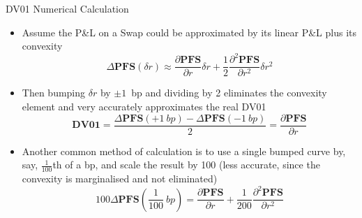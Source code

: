 \documentclass{beamer}
\begin{document}

\begin{frame}{DV01 Numerical Calculation}
\begin{itemize}
	\item<1-> Assume the P\&L on a Swap could be approximated by its linear P\&L plus its convexity
	\begin{equation*}
	\Delta \textbf{PFS}(\delta r)\approx \frac{\partial \textbf{PFS} }{\partial r}\delta r + \frac{1}{2}\frac{\partial^2 \textbf{PFS}}{\partial r^2}\delta r^2
	\end{equation*}
	\item<2-> Then bumping $\delta r$ by $\pm 1$~bp and dividing by 2 eliminates the convexity element and very accurately approximates the real DV01
	\begin{equation*}
	\textbf{DV01} = \frac{\Delta \textbf{PFS}(+1~bp)-\Delta \textbf{PFS}(-1~bp)}{2}=\frac{\partial \textbf{PFS} }{\partial r}
	\end{equation*}
	\item<3-> Another common method of calculation is to use a single bumped curve by, say, $\frac{1}{100}$th of a bp, and scale the result by 100 (less accurate, since the convexity is marginalised and not eliminated)
	\begin{equation*}
	100\Delta \textbf{PFS}\left(\frac{1}{100}~bp\right)=\frac{\partial \textbf{PFS}}{\partial r}+\frac{1}{200}\frac{\partial^2\textbf{PFS}}{\partial r^2}
	\end{equation*}
	\end{itemize}
\end{frame}
\end{document}
